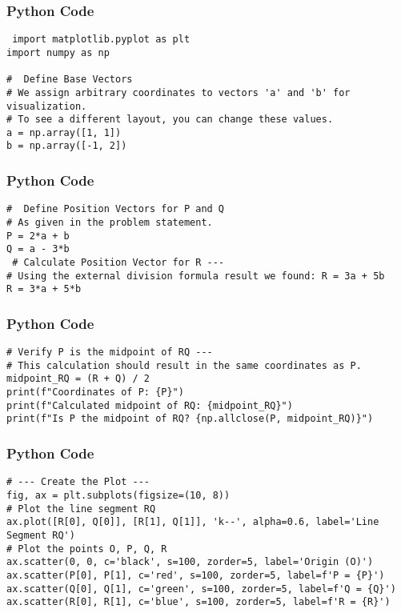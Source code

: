\documentclass{beamer}
\begin{document}
\begin{frame}[fragile]
    \frametitle{Python Code}
    \begin{lstlisting}
 import matplotlib.pyplot as plt
import numpy as np

#  Define Base Vectors
# We assign arbitrary coordinates to vectors 'a' and 'b' for visualization.
# To see a different layout, you can change these values.
a = np.array([1, 1])
b = np.array([-1, 2])

\end{lstlisting}
\end{frame}

\begin{frame}[fragile]
    \frametitle{Python Code}

    \begin{lstlisting}
#  Define Position Vectors for P and Q
# As given in the problem statement.
P = 2*a + b
Q = a - 3*b
 # Calculate Position Vector for R ---
# Using the external division formula result we found: R = 3a + 5b
R = 3*a + 5*b
    \end{lstlisting}
\end{frame}


\begin{frame}[fragile]
    \frametitle{Python Code}

    \begin{lstlisting}
# Verify P is the midpoint of RQ ---
# This calculation should result in the same coordinates as P.
midpoint_RQ = (R + Q) / 2
print(f"Coordinates of P: {P}")
print(f"Calculated midpoint of RQ: {midpoint_RQ}")
print(f"Is P the midpoint of RQ? {np.allclose(P, midpoint_RQ)}")

\end{lstlisting}
\end{frame}

 
\begin{frame}[fragile]
    \frametitle{Python Code}

    \begin{lstlisting}
# --- Create the Plot ---
fig, ax = plt.subplots(figsize=(10, 8))
# Plot the line segment RQ
ax.plot([R[0], Q[0]], [R[1], Q[1]], 'k--', alpha=0.6, label='Line Segment RQ')
# Plot the points O, P, Q, R
ax.scatter(0, 0, c='black', s=100, zorder=5, label='Origin (O)')
ax.scatter(P[0], P[1], c='red', s=100, zorder=5, label=f'P = {P}')
ax.scatter(Q[0], Q[1], c='green', s=100, zorder=5, label=f'Q = {Q}')
ax.scatter(R[0], R[1], c='blue', s=100, zorder=5, label=f'R = {R}')
    \end{lstlisting}
\end{frame}
\end{document}
